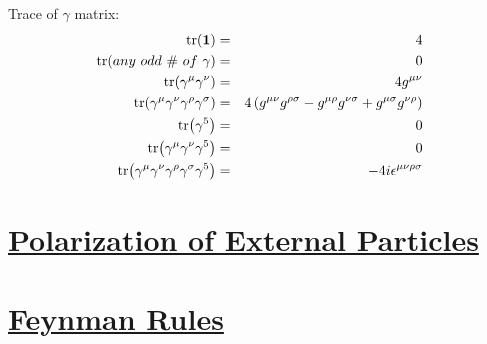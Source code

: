 Trace of $\gamma$ matrix:
\begin{eqnarray*}
    \tr(\mathbf{1}) &=& 4\\
    \tr( any\ odd\ \#\  of\ \gamma) &=& 0 \\
    \tr(\gamma^\mu\gamma^\nu) &=& 4g^{\mu\nu} \\
    \tr(\gamma^\mu\gamma^\nu\gamma^\rho\gamma^\sigma) &=& 4\left(g^{\mu\nu}g^{\rho\sigma} - g^{\mu\rho}g^{\nu\sigma} + g^{\mu\sigma}g^{\nu\rho}\right) \\
    \tr(\gamma^5) &=& 0 \\
    \tr(\gamma^\mu\gamma^\nu\gamma^5) &=& 0 \\
    \tr(\gamma^\mu\gamma^\nu\gamma^\rho\gamma^\sigma\gamma^5) &=& -4i\epsilon^{\mu\nu\rho\sigma} 
\end{eqnarray*}





\section{\protect\hyperlink{:}{Polarization of External Particles}}





\section{\protect\hyperlink{:}{Feynman Rules}}




